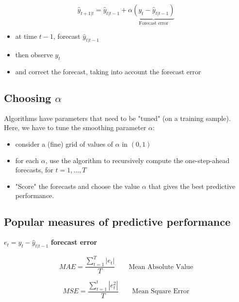 \documentclass[dvipsnames,12pt]{book}
\begin{document}
                \begin{equation}
                    \hat{y}_{t+1 | t} = \hat{y}_{t | t-1} + \alpha \underbrace{(y_t - \hat{y}_{t | t-1})}_{\text{Forecast error}}
                \end{equation}
    
                \begin{itemize}
                    \item at time $t-1$, forecast $\hat{y}_{t | t-1}$
                    \item then observe $y_t$
                    \item and correct the forecast, taking into account the forecast error
                \end{itemize}

            \subsection{Choosing \(\alpha\)}

                Algorithms have parameters that need to be "tuned" (on a training sample). Here, we have to tune the smoothing parameter $\alpha$: 

                \begin{itemize}
                    \item consider a (fine) grid of values of $\alpha$ in $(0,1)$
                    \item for each $\alpha$, use the algorithm to recursively compute the one-step-ahead forecasts, for $t=1, \ldots, T$
                    \item "Score" the forecasts and choose the value $\alpha$ that gives the best predictive performance. 
                \end{itemize}

            \subsection{Popular measures of predictive performance}

                $e_t = y_t - \hat{y}_{t | t-1}$   \textbf{forecast error}

                \begin{equation}
                    MAE= \frac{\sum_{t=1}^T | e_t |}{T}  \quad \quad \mbox{Mean Absolute Value}
                \end{equation}

                \begin{equation}
                    MSE =  \frac{\sum_{t=1}^t | e_t^2 |}{T}  \quad \quad \mbox{Mean Square Error}
                \end{equation}
\end{document}
